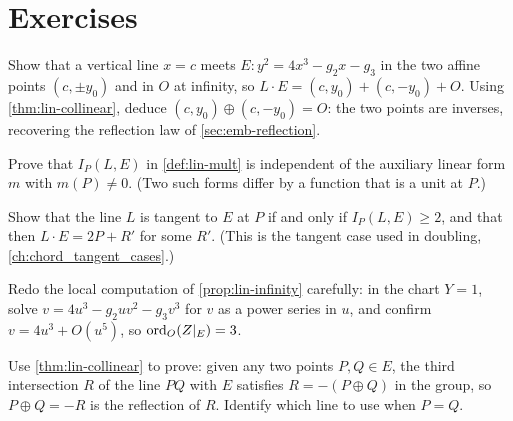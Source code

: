 \section*{Exercises}

\begin{exercise}
\label{ex:lin-vertical}
Show that a vertical line \(x = c\) meets \(E : y^2 = 4x^3 - g_2 x - g_3\) in the
two affine points \((c, \pm y_0)\) and in \(O\) at infinity, so
\(L \cdot E = (c, y_0) + (c, -y_0) + O\). Using \cref{thm:lin-collinear}, deduce
\((c, y_0) \oplus (c, -y_0) = O\): the two points are inverses, recovering the
reflection law of \cref{sec:emb-reflection}.
\end{exercise}

\begin{exercise}
\label{ex:lin-mult-welldef}
Prove that \(I_P(L, E)\) in \cref{def:lin-mult} is independent of the auxiliary
linear form \(m\) with \(m(P) \ne 0\). (Two such forms differ by a function that is
a unit at \(P\).)
\end{exercise}

\begin{exercise}
\label{ex:lin-tangent}
Show that the line \(L\) is tangent to \(E\) at \(P\) if and only if
\(I_P(L, E) \ge 2\), and that then \(L \cdot E = 2P + R'\) for some \(R'\).
(This is the tangent case used in doubling, \cref{ch:chord_tangent_cases}.)
\end{exercise}

\begin{exercise}
\label{ex:lin-infinity-mult}
Redo the local computation of \cref{prop:lin-infinity} carefully: in the chart
\(Y = 1\), solve \(v = 4u^3 - g_2 u v^2 - g_3 v^3\) for \(v\) as a power series in
\(u\), and confirm \(v = 4u^3 + O(u^5)\), so \(\operatorname{ord}_O(Z|_E) = 3\).
\end{exercise}

\begin{exercise}
\label{ex:lin-three-collinear}
Use \cref{thm:lin-collinear} to prove: given any two points \(P, Q \in E\), the
third intersection \(R\) of the line \(PQ\) with \(E\) satisfies \(R = -(P \oplus Q)\)
in the group, so \(P \oplus Q = -R\) is the reflection of \(R\). Identify which
line to use when \(P = Q\).
\end{exercise}
